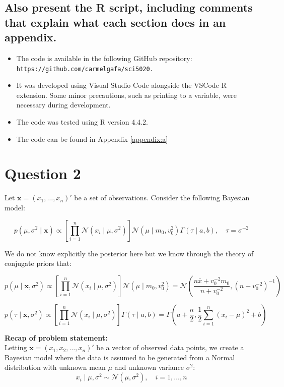 \documentclass[]{article}
\begin{document}
\subsection{Also present the R script, including comments that explain what each section does in
an appendix. }

\begin{itemize}
	\item The code is available in the following GitHub repository: \\ \texttt{https://github.com/carmelgafa/sci5020.}
	\item It was developed using Visual Studio Code alongside the VSCode R extension. Some minor precautions, such as printing to a variable, were necessary during development.
	\item The code was tested using R version 4.4.2.
	\item The code can be found in Appendix \ref{appendix:a}
\end{itemize}



	
\section{Question 2}

Let $ \textbf{x} = (x_1, \dots, x_n)'$ be a set of observations. Consider the following Bayesian model:

$$
p(\mu, \sigma^2 \mid \textbf{x}) 
\propto 
\left[ \prod_{i=1}^n \mathcal{N}(x_i \mid \mu, \sigma^2) \right] 
\mathcal{N}(\mu \mid m_0, v_0^2) 
\Gamma(\tau \mid a, b), 
\quad \tau = \sigma^{-2}
$$

We do not know explicitly the posterior here but we know through the theory of conjugate priors that:

$$
p(\mu \mid \textbf{x}, \sigma^2) 
\propto 
\left[ \prod_{i=1}^n \mathcal{N}(x_i \mid \mu, \sigma^2) \right] 
\mathcal{N}(\mu \mid m_0, v_0^2) = 
\mathcal{N} \left( \frac{n \bar{x} + v_0^{-2} m_0}{n + v_0^{-2}}, \left(n + v_0^{-2} \right)^{-1} \right)
$$

$$
p(\tau \mid \textbf{x}, \sigma^2) 
\propto 
\left[ \prod_{i=1}^n \mathcal{N}(x_i \mid \mu, \sigma^2) \right] 
\Gamma(\tau \mid a, b) = \Gamma\left( a + \frac{n}{2}, \frac{1}{2} \sum_{i=1}^n (x_i - \mu)^2 + b \right)
$$


\noindent \textbf{Recap of problem statement:}\\

Letting $\mathbf{x} = (x_1, x_2, \dots, x_n)'$ be a vector of observed data points, we create a Bayesian model where the data is assumed to be generated from a Normal distribution with unknown mean $\mu$ and unknown variance $\sigma^2$:
$$
x_i \mid \mu, \sigma^2 \sim \mathcal{N}(\mu, \sigma^2), \quad i = 1, \dots, n
$$
\end{document}
